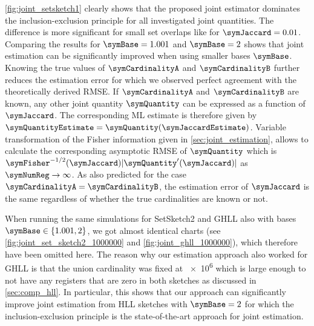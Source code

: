 \documentclass[sigconf, nonacm]{acmart}
\newif\ifextended\extendedtrue
\begin{document}
\cref{fig:joint_setsketch1} clearly shows that the proposed joint estimator dominates the inclusion-exclusion principle for all investigated joint quantities. The difference is more significant for small set overlaps like for $\symJaccard=0.01$. Comparing the results for $\symBase=1.001$ and $\symBase=2$ shows that joint estimation can be significantly improved when using smaller bases $\symBase$. Knowing the true values of $\symCardinalityA$ and $\symCardinalityB$ further reduces the estimation error for which we observed perfect agreement with the theoretically derived \ac{RMSE}. If $\symCardinalityA$ and $\symCardinalityB$ are known, any other joint quantity $\symQuantity$ can be expressed as a function of $\symJaccard$. The corresponding \ac{ML} estimate is therefore given by $\symQuantityEstimate = \symQuantity(\symJaccardEstimate)$. Variable transformation of the Fisher information given in \cref{sec:joint_estimation}, allows to calculate the corresponding asymptotic \ac{RMSE} of $\symQuantity$ which is $\symFisher^{-1/2}(\symJaccard)|\symQuantity'(\symJaccard)|$ as $\symNumReg\rightarrow \infty$.
As also predicted for the case $\symCardinalityA=\symCardinalityB$, the estimation error of $\symJaccard$ is the same regardless of whether the true cardinalities are known or not.

When running the same simulations for SetSketch2 and \ac{GHLL} also with bases $\symBase\in\lbrace 1.001,2\rbrace$, we got almost identical charts \ifextended(see \cref{fig:joint_set_sketch2_1000000} and \cref{fig:joint_ghll_1000000})\else\cite{Ertl2021}\fi, which therefore have been omitted here. The reason why our estimation approach also worked for \ac{GHLL} is that the union cardinality was fixed at \num{e6} which is large enough to not have any registers that are zero in both sketches as discussed in \cref{sec:comp_hll}. In particular, this shows that our approach can significantly improve joint estimation from \ac{HLL} sketches with $\symBase=2$ for which the inclusion-exclusion principle is the state-of-the-art approach for joint estimation. 
\end{document}
